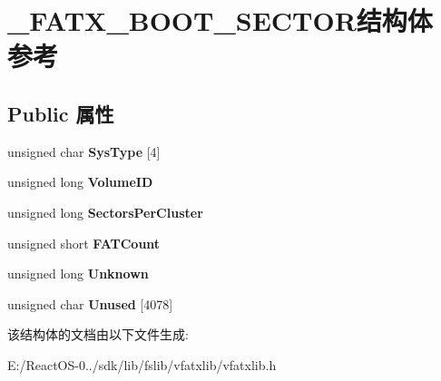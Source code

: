 \hypertarget{struct___f_a_t_x___b_o_o_t___s_e_c_t_o_r}{}\section{\+\_\+\+F\+A\+T\+X\+\_\+\+B\+O\+O\+T\+\_\+\+S\+E\+C\+T\+O\+R结构体 参考}
\label{struct___f_a_t_x___b_o_o_t___s_e_c_t_o_r}
\subsection*{Public 属性}
\begin{DoxyCompactItemize}
\item 
\mbox{\label{struct___f_a_t_x___b_o_o_t___s_e_c_t_o_r_a099c8fa34af194c933b4702608bd9427}} 
unsigned char {\bfseries Sys\+Type} \mbox{[}4\mbox{]}
\item 
\mbox{\label{struct___f_a_t_x___b_o_o_t___s_e_c_t_o_r_a1c5f3c30b5f3a822e7d27d6db0de05f8}} 
unsigned long {\bfseries Volume\+ID}
\item 
\mbox{\label{struct___f_a_t_x___b_o_o_t___s_e_c_t_o_r_ac3ab3179826b54efbdfa2728e70bafff}} 
unsigned long {\bfseries Sectors\+Per\+Cluster}
\item 
\mbox{\label{struct___f_a_t_x___b_o_o_t___s_e_c_t_o_r_a163dbf84549f3698041a7ae7e5178cc5}} 
unsigned short {\bfseries F\+A\+T\+Count}
\item 
\mbox{\label{struct___f_a_t_x___b_o_o_t___s_e_c_t_o_r_a0a6b0ae583f73db4ae398b8c149b6a6c}} 
unsigned long {\bfseries Unknown}
\item 
\mbox{\label{struct___f_a_t_x___b_o_o_t___s_e_c_t_o_r_a0bcf306d9280471cacf0c46ac5b1be10}} 
unsigned char {\bfseries Unused} \mbox{[}4078\mbox{]}
\end{DoxyCompactItemize}


该结构体的文档由以下文件生成\+:\begin{DoxyCompactItemize}
\item 
E\+:/\+React\+O\+S-\/0../sdk/lib/fslib/vfatxlib/vfatxlib.\+h\end{DoxyCompactItemize}

